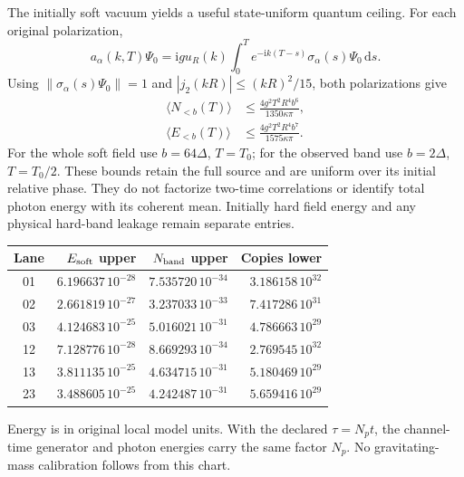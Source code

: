 \documentclass[10pt,twocolumn,letterpaper]{article}
\newcommand{\dd}{\mathrm{d}}
\newcommand{\ii}{\mathrm{i}}
\begin{document}
The initially soft vacuum yields a useful state-uniform quantum ceiling.
For each original polarization,
\begin{equation}
 a_\alpha(k,T)\Psi_0=\ii g u_R(k)
    \int_0^T e^{-\ii k(T-s)}\sigma_\alpha(s)\Psi_0\,\dd s .
\end{equation}
Using $\|\sigma_\alpha(s)\Psi_0\|=1$ and
$|j_2(kR)|\le(kR)^2/15$, both polarizations give
\begin{equation}
 \begin{split}
 \langle N_{<b}(T)\rangle
   &\le\frac{4g^2T^2R^4b^6}{1350\kappa\pi},\\
 \langle E_{<b}(T)\rangle
   &\le\frac{4g^2T^2R^4b^7}{1575\kappa\pi}.
 \end{split}
\end{equation}
For the whole soft field use $b=64\Delta$, $T=T_0$; for the observed
band use $b=2\Delta$, $T=T_0/2$. These bounds retain the full source
and are uniform over its initial relative phase. They do not factorize
two-time correlations or identify total photon energy with its coherent
mean. Initially hard field energy and any physical hard-band leakage
remain separate entries.

\begin{center}\small
\begin{tabular}{crrr}
\hline
Lane & $E_{\rm soft}$ upper & $N_{\rm band}$ upper & Copies lower\\\hline
01&$6.196637\,10^{-28}$&$7.535720\,10^{-34}$&$3.186158\,10^{32}$\\
02&$2.661819\,10^{-27}$&$3.237033\,10^{-33}$&$7.417286\,10^{31}$\\
03&$4.124683\,10^{-25}$&$5.016021\,10^{-31}$&$4.786663\,10^{29}$\\
12&$7.128776\,10^{-28}$&$8.669293\,10^{-34}$&$2.769545\,10^{32}$\\
13&$3.811135\,10^{-25}$&$4.634715\,10^{-31}$&$5.180469\,10^{29}$\\
23&$3.488605\,10^{-25}$&$4.242487\,10^{-31}$&$5.659416\,10^{29}$\\\hline
\end{tabular}
\end{center}
Energy is in original local model units. With the declared
$\tau=N_pt$, the channel-time generator and photon energies carry the
same factor $N_p$. No gravitating-mass calibration follows from this chart.
\end{document}
